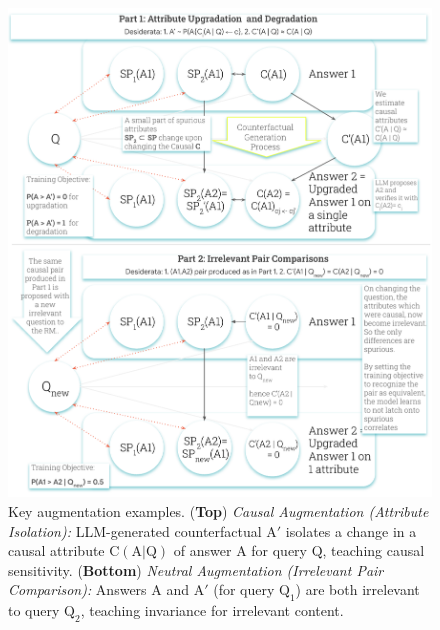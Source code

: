 \begin{figure}
    \centering
    \vspace{-0.1in}
    \includegraphics[width=1.0\linewidth]{images/CausalPerturbations.pdf}
    \vspace{-0.2in}
    \caption{Key \carma{} augmentation examples.
(\textbf{Top}) \textit{Causal Augmentation (Attribute Isolation):} LLM-generated counterfactual $\mathrm{A}'$ isolates a change in a causal attribute $\mathrm{C}(\mathrm{A}|\mathrm{Q})$ of answer $\mathrm{A}$ for query $\mathrm{Q}$, teaching causal sensitivity.
(\textbf{Bottom}) \textit{Neutral Augmentation (Irrelevant Pair Comparison):} Answers $\mathrm{A}$ and $\mathrm{A}'$ (for query $\mathrm{Q}_1$) are both irrelevant to query $\mathrm{Q}_2$, teaching invariance for irrelevant content.\vspace{-0.9in}}
    \label{fig:augmentation_strategies_detail}
\end{figure}

